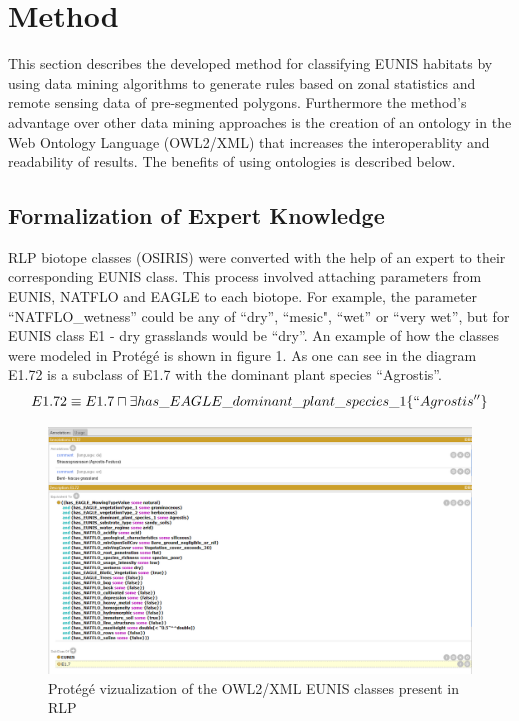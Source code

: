 \documentclass[authoryear, review,12pt,number]{elsarticle}
\begin{document}
\section{Method}
This section describes the developed method for classifying EUNIS habitats by
using data mining algorithms to generate rules based on zonal statistics and
remote sensing data of pre-segmented polygons. Furthermore the method's
advantage over other data mining approaches is the creation of an ontology in
the Web Ontology Language (OWL2/XML) that increases the interoperablity and
readability of results. The benefits of using ontologies is described below.
\subsection{Formalization of Expert Knowledge}
RLP biotope classes (OSIRIS) were converted with the help of an
expert to their corresponding EUNIS class. This process involved attaching
parameters from EUNIS, NATFLO and EAGLE to each biotope. For example, the parameter 
``NATFLO\_wetness'' could be any of ``dry'', ``mesic", ``wet'' or ``very wet'', 
but for EUNIS class E1 - dry grasslands would be ``dry''. An example of how the 
classes were modeled in Prot\'eg\'e is shown in figure 1. As one can see in the
diagram E1.72 is a subclass of E1.7 with the dominant plant species
``Agrostis''. 
$$ E1.72 \equiv  E1.7 \sqcap \exists has\_EAGLE\_dominant\_plant\_species\_1
\{``Agrostis'' \}
$$
\begin{figure}
	\includegraphics[width=1\linewidth]{diagrams/protege_description_eunis.png}
	\caption{Prot\'eg\'e vizualization of the OWL2/XML EUNIS classes present in
	RLP}
\end{figure}
\end{document}

